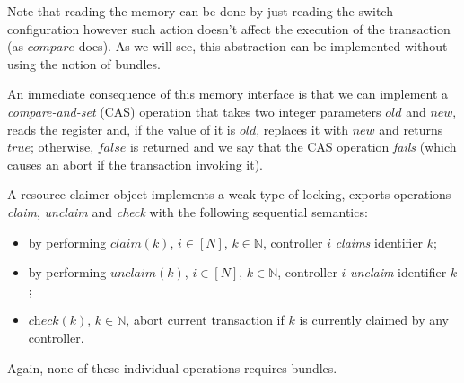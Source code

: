 \documentclass[conference]{sigcomm-alternate}
\newcommand{\Nat}{\mathbb{N}}
\newcommand{\claimcheck}{check\xspace}
\newcommand{\compare}{compare\xspace}
\begin{document}
Note that reading the memory can be done by just reading the switch configuration however such action doesn't affect the execution of the transaction (as $\textit{\compare}$ does).
As we will see, this abstraction can be implemented
without using the notion of bundles.

An immediate consequence of this memory interface is 
that we can implement a \emph{compare-and-set} (CAS) operation that takes two integer parameters
$\textit{old}$ and $\textit{new}$, reads the register and, if the
value of it is $\textit{old}$, replaces it with $\textit{new}$ and
returns $\textit{true}$; otherwise, $\textit{false}$ is returned and
we say that the CAS operation \emph{fails} (which causes an abort if
the transaction invoking it).


A resource-claimer object implements a weak type of locking, exports operations \emph{claim},
\emph{unclaim} and \emph{\claimcheck} with the following sequential
semantics:

\begin{itemize}
\item by performing $\textit{claim}(k)$, $i\in[N]$,
  $k\in\Nat$, controller $i$ \emph{claims}
  identifier $k$;


\item by performing $\textit{unclaim}(k)$, $i\in[N]$, $k\in\Nat$, controller $i$
  \emph{unclaim} identifier $k$;

\item $\textit{\claimcheck}(k)$, $k\in\Nat$,
abort current transaction if $k$ is currently claimed by any controller.

\end{itemize}

Again, none of these individual operations 
requires bundles.
\end{document}
